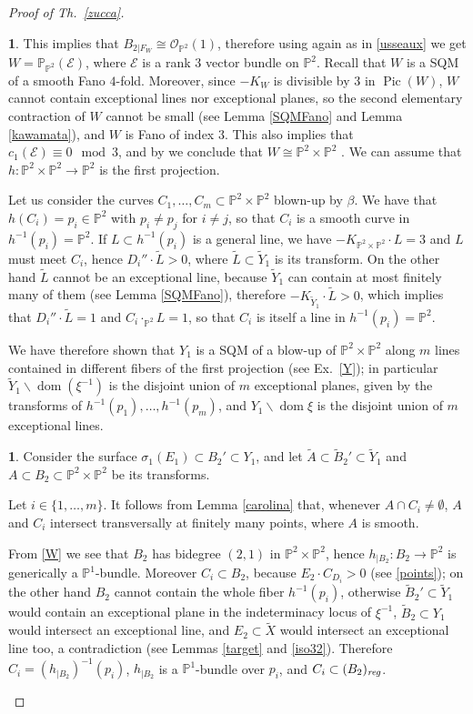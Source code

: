 \documentclass[a4paper,12pt]{amsart}
\theoremstyle{definition}
\newtheorem{prg}[thm]{}
\numberwithin{figure}{section}
\numberwithin{table}{section}
\newcommand{\w}{\widetilde}
\newcommand{\ma}{\mathcal}
\newcommand{\ol}{\mathcal{O}}
\newcommand{\pr}{\mathbb{P}}
\newcommand{\dom}{\operatorname{dom}}
\newcommand{\Pic}{\operatorname{Pic}}
\newcommand{\reg}{\text{\it reg}}
\begin{document}
\begin{proof}[Proof of Th.~\ref{zucca}]
\begin{prg}
This implies that
  $B_{2|F_W}\cong\ol_{\pr^2}(1)$, therefore using again  \cite[Prop.~3.2.1]{beltrametti_sommese} as in \ref{usseaux} we get
  $W=\pr_{\pr^2}(\ma{E})$, where $\ma{E}$ is a rank $3$ vector bundle on $\pr^2$.
  Recall that $W$ is a SQM of a smooth Fano $4$-fold. Moreover, since $-K_W$ is divisible by $3$ in $\Pic(W)$,
  $W$ cannot contain exceptional lines nor exceptional planes, so the second elementary contraction of $W$ cannot be small (see Lemma \ref{SQMFano} and Lemma \ref{kawamata}), and $W$ is Fano of index
    $3$. This also implies that $c_1(\ma{E})\equiv 0\mod 3$, and by \cite{szurekwisnnagoya}
   we conclude that $W\cong\pr^2\times\pr^2$ . We can assume that $h\colon \pr^2\times\pr^2\to\pr^2$ is the first projection.

Let us consider the curves $C_1,\dotsc,C_m\subset \pr^2\times\pr^2$ blown-up by $\beta$.    
 We  have
 that $h(C_i)=p_i\in\pr^2$ with $p_i\neq p_j$ for $i\neq j$, so that $C_i$ is a smooth curve in $h^{-1}(p_i)=\pr^2$. If $L\subset h^{-1}(p_i)$ is a general line, we have $-K_{\pr^2\times\pr^2}\cdot L=3$ and $L$ must meet $C_i$, hence $D_i''\cdot\w{L}>0$, where $\w{L}\subset\w{Y}_1$ is 
its transform. On the other hand $\w{L}$ cannot be an exceptional line, because $\w{Y}_1$ can contain at most finitely many of them (see Lemma \ref{SQMFano}), therefore  $-K_{\w{Y}_1}\cdot \w{L}>0$, which implies that $D_i''\cdot\w{L}=1$ 
and  $C_i\cdot_{\pr^2} L=1$, so that $C_i$ is itself a line in $h^{-1}(p_i)=\pr^2$.

We have therefore shown that
$Y_1$ is a SQM of a blow-up of $\pr^2\times\pr^2$ along $m$ lines contained in different fibers of the first projection (see Ex.~\ref{Y}); in particular $\w{Y}_1\smallsetminus\dom(\xi^{-1})$ is the disjoint union of $m$ exceptional planes, given by the transforms of $h^{-1}(p_1),\dotsc,h^{-1}(p_m)$, and $Y_1\smallsetminus\dom\xi$ is the disjoint union of $m$ exceptional lines.
 \end{prg}
 \begin{prg}\label{frecciar}
  Consider the surface $\sigma_1(E_1)\subset B_2'\subset Y_1$, and let $\w{A}\subset\w{B}_2'\subset\w{Y}_1$ and $A\subset B_2\subset \pr^2\times\pr^2$ be its transforms.
 
  Let $i\in\{1,\dotsc,m\}$. It follows from Lemma \ref{carolina} that, whenever $A\cap C_i\neq\emptyset$, $A$ and $C_i$ intersect transversally at finitely many points, where $A$ is smooth.
  
From \eqref{W} we see that $B_2$ has bidegree $(2,1)$ in $\pr^2\times\pr^2$,
hence $h_{|B_2}\colon B_2\to\pr^2$ is generically a $\pr^1$-bundle.
Moreover $C_i\subset B_2$, because $E_2\cdot C_{D_i}>0$ (see \ref{points}); on the other hand $B_2$ cannot contain the whole fiber $h^{-1}(p_i)$, otherwise $\w{B}_2'\subset\w{Y}_1$ would contain an exceptional plane in the indeterminacy locus of $\xi^{-1}$, $\w{B}_2\subset{Y}_1$ would intersect an exceptional line, and $E_2\subset\w{X}$ would intersect an exceptional line too, a contradiction (see Lemmas  \ref{target} and \ref{iso32}).  Therefore $C_i=(h_{|B_2})^{-1}(p_i)$, $h_{|B_2}$ is a $\pr^1$-bundle over $p_i$, and
 $C_i\subset (B_2)_{\reg}$.
  

\end{prg}
\end{proof}
\end{document}
